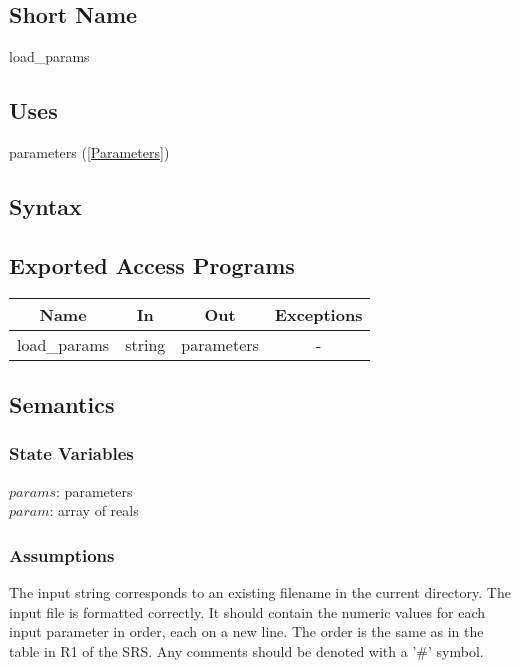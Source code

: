 \documentclass[12pt]{article}
\begin{document}
\subsection{Short Name}

load\_params

\subsection{Uses}

parameters (\ref{Parameters})

\subsection{Syntax}

\subsection{Exported Access Programs}

\begin{center}
\begin{tabular}{c c c c}
\hline
\textbf{Name} & \textbf{In} & \textbf{Out} & \textbf{Exceptions} \\
\hline
load\_params & string & parameters &  - \\
\hline
\end{tabular}
\end{center}

\subsection{Semantics}

\subsubsection{State Variables}

$params$: parameters \\
$param$: array of reals

\subsubsection{Assumptions}

The input string corresponds to an existing filename in the current
directory. The input file is formatted correctly. It should contain the numeric
values for each input parameter in order, each on a new line. The order is the
same as in the table in R1 of the SRS. Any comments should be denoted with a
'\#' symbol.
\end{document}
